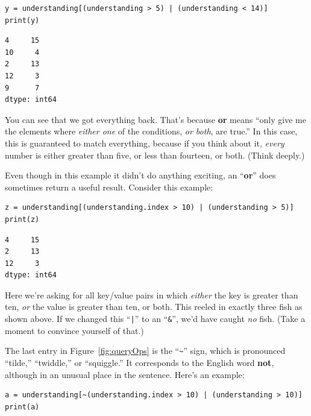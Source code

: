 \begin{Verbatim}[fontsize=\footnotesize,samepage=true,frame=single,framesep=3mm]
y = understanding[(understanding > 5) | (understanding < 14)]
print(y)
\end{Verbatim}

\begin{Verbatim}[fontsize=\small,samepage=true,frame=leftline,framesep=5mm,framerule=1mm]
4     15
10     4
2     13
12     3
9      7
dtype: int64
\end{Verbatim}

You can see that we got everything back. That's because \textbf{or} means
``only give me the elements where \textit{either one} of the conditions,
\textit{or both}, are true.'' In this case, this is guaranteed to match
everything, because if you think about it, \textit{every} number is either
greater than five, or less than fourteen, or both. (Think deeply.)

Even though in this example it didn't do anything exciting, an ``\textbf{or}''
does sometimes return a useful result. Consider this example:

\begin{Verbatim}[fontsize=\CBCodeSmall,samepage=true,frame=single,framesep=3mm]
z = understanding[(understanding.index > 10) | (understanding > 5)]
print(z)
\end{Verbatim}

\begin{Verbatim}[fontsize=\small,samepage=true,frame=leftline,framesep=5mm,framerule=1mm]
4     15
2     13
12     3
dtype: int64
\end{Verbatim}

Here we're asking for all key/value pairs in which \textit{either} the key is
greater than ten, \textit{or} the value is greater than ten, or both. This
reeled in exactly three fish as shown above. If we changed this ``\texttt{|}''
to an ``\texttt{\&}'', we'd have caught \textit{no} fish. (Take a moment to
convince yourself of that.)


The last entry in Figure~\ref{fig:queryOps} is the ``\texttt{\textasciitilde}''
sign, which is pronounced ``tilde,'' ``twiddle,'' or ``squiggle.'' It
corresponds to the English word \textbf{not}, although in an unusual place in
the sentence. Here's an example:

\begin{Verbatim}[fontsize=\CBCodeSmall,samepage=true,frame=single,framesep=3mm]
a = understanding[~(understanding.index > 10) | (understanding > 10)]
print(a)
\end{Verbatim}

